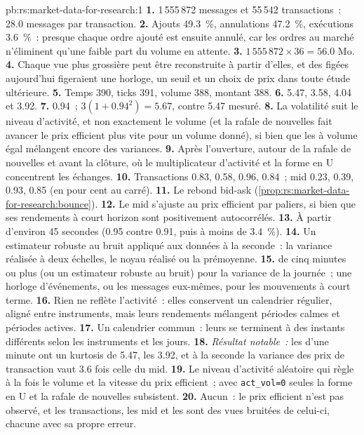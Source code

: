 \begin{solution}{pb:rs:market-data-for-research:1}
\textbf{1.} 1\,555\,872 messages et 55\,542 transactions~: 28.0 messages par transaction. \textbf{2.} Ajouts 49.3~\%, annulations 47.2~\%,
exécutions 3.6~\%~: presque chaque ordre ajouté est ensuite annulé, car les ordres au marché n'éliminent qu'une faible part du
volume en attente. \textbf{3.} $1\,555\,872 \times 36 = 56.0$ Mo. \textbf{4.} Chaque vue plus grossière peut être reconstruite à partir d'elles, et des  figées
aujourd'hui figeraient une horloge, un seuil et un choix de prix dans toute étude ultérieure. \textbf{5.} Temps 390, ticks 391, volume 388,
montant 388. \textbf{6.} 5.47, 3.58, 4.04 et 3.92. \textbf{7.} 0.94~; $3(1 + 0.94^2) = 5.67$, contre 5.47 mesuré.
\textbf{8.} La volatilité suit le niveau d'activité, et non exactement le volume (et la rafale de nouvelles fait avancer le prix efficient plus vite pour un
volume donné), si bien que les  à volume égal mélangent encore des variances. \textbf{9.} Après l'ouverture, autour de la rafale de nouvelles et avant la clôture,
où le multiplicateur d'activité et la forme en U concentrent les échanges. \textbf{10.} Transactions 0.83, 0.58, 0.96, 0.84~; mid 0.23, 0.39, 0.93,
0.85 (en pour cent au carré). \textbf{11.} Le rebond bid-ask (\cref{prop:rs:market-data-for-research:bounce}). \textbf{12.} Le mid
s'ajuste au prix efficient par paliers, si bien que ses rendements à court horizon sont positivement autocorrélés. \textbf{13.} À partir d'environ 45
secondes (0.95 contre 0.91, puis à moins de 3.4~\%). \textbf{14.} Un estimateur robuste au bruit appliqué aux données à la seconde~: la variance
réalisée à deux échelles, le noyau réalisé ou la prémoyenne. \textbf{15.}  de cinq minutes ou plus (ou un estimateur robuste au
bruit) pour la variance de la journée~; une horloge d'événements, ou les messages eux-mêmes, pour les mouvements à court terme. \textbf{16.} Rien ne reflète
l'activité~: elles conservent un calendrier régulier, aligné entre instruments, mais leurs rendements mélangent périodes calmes et périodes actives. \textbf{17.} Un
calendrier commun~: leurs  se terminent à des instants différents selon les instruments et les jours. \textbf{18.} \emph{Résultat
notable~:} les  d'une minute ont un kurtosis de 5.47, les  3.92, et à la seconde la variance des prix de transaction vaut
3.6 fois celle du mid. \textbf{19.} Le niveau d'activité aléatoire qui règle à la fois le volume et la vitesse du prix efficient~; avec
\texttt{act\_vol=0} seules la forme en U et la rafale de nouvelles subsistent. \textbf{20.} Aucun~: le prix efficient n'est pas observé, et les transactions,
les mid et les  sont des vues bruitées de celui-ci, chacune avec sa propre erreur.
\end{solution}

